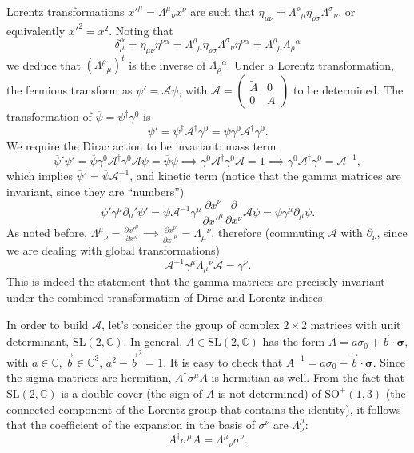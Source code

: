 \documentclass[a4paper,12pt]{book}
\begin{document}
Lorentz transformations $x'^\mu=\Lambda^\mu{}_\nu x^\nu$ are such that $\eta_{\mu\nu}=\Lambda^\rho{}_\mu\eta_{\rho\sigma}\Lambda^\sigma{}_\nu$, or equivalently $x'^2=x^2$. Noting that
\[\delta_\mu^\alpha=\eta_{\mu\nu}\eta^{\nu\alpha}=\Lambda^\rho{}_\mu\eta_{\rho\sigma}\Lambda^\sigma{}_\nu\eta^{\nu\alpha}=\Lambda^\rho{}_\mu\Lambda_\rho{}^\alpha\]
we deduce that $(\Lambda^\rho{}_\mu)^t$ is the inverse of $\Lambda_\rho{}^\alpha$. Under a Lorentz transformation, the fermions transform as $\psi'=\mathcal A\psi$, with $\mathcal A=\begin{pmatrix}\tilde A& 0\\ 0& A\end{pmatrix}$ to be determined. The transformation of $\overline\psi=\psi^\dagger\gamma^0$ is
\[\overline\psi'=\psi^\dagger \mathcal A^\dagger\gamma^0=\overline\psi\gamma^0\mathcal A^\dagger\gamma^0.\]
We require the Dirac action to be invariant: mass term
\begin{equation}
\overline\psi'\psi'=\overline\psi\gamma^0\mathcal A^\dagger\gamma^0\mathcal A\psi=\overline\psi\psi\implies\gamma^0\mathcal A^\dagger\gamma^0\mathcal A=1\implies\gamma^0\mathcal A^\dagger\gamma^0=\mathcal A^{-1},
\label{eqn:Agammazero}
\end{equation}
which implies $\overline\psi'=\overline\psi\mathcal A^{-1}$, and kinetic term (notice that the gamma matrices are invariant, since they are ``numbers'')
\[\overline\psi'\gamma^\mu\partial_\mu'\psi'=\overline\psi\mathcal A^{-1}\gamma^\mu\frac{\partial x^\nu}{\partial x'^\mu}\frac{\partial}{\partial x^\nu}\mathcal A\psi=\overline\psi\gamma^\mu\partial_\mu\psi.\]
As noted before, $\Lambda^\mu{}_\nu=\frac{\partial x'^\mu}{\partial x^\nu}\implies \frac{\partial x^\nu}{\partial x'^\mu}=\Lambda_\mu{}^\nu$, therefore (commuting $\mathcal A$ with $\partial_\nu$, since we are dealing with global transformations)
\begin{equation}
\mathcal A^{-1}\gamma^\mu\Lambda_\mu{}^\nu\mathcal A=\gamma^\nu.
\label{eqn:AgammaLambda}
\end{equation}
This is indeed the statement that the gamma matrices are precisely invariant under the combined transformation of Dirac and Lorentz indices.

In order to build $\mathcal A$, let's consider the group of complex $2\times2$ matrices with unit determinant, $\text{SL}(2,\mathbb C)$. In general, $A\in\text{SL}(2,\mathbb C)$ has the form $A=a\sigma_0+\vec b\cdot\boldsymbol\sigma$, with $a\in\mathbb C$, $\vec b\in\mathbb C^3$, $a^2-\vec b^2=1$. It is easy to check that $A^{-1}=a\sigma_0-\vec b\cdot\boldsymbol\sigma$. Since the sigma matrices are hermitian, $A^\dagger\sigma^\mu A$ is hermitian as well. From the fact that $\text{SL}(2,\mathbb C)$ is a double cover (the sign of $A$ is not determined) of $\text{SO}^+(1,3)$ (the connected component of the Lorentz group that contains the identity), it follows that the coefficient of the expansion in the basis of $\sigma^\nu$ are $\Lambda^\mu_\nu$:
\begin{equation}
A^\dagger\sigma^\mu A=\Lambda^\mu{}_\nu\sigma^\nu.
\label{eqn:ALambda}
\end{equation}
\end{document}
